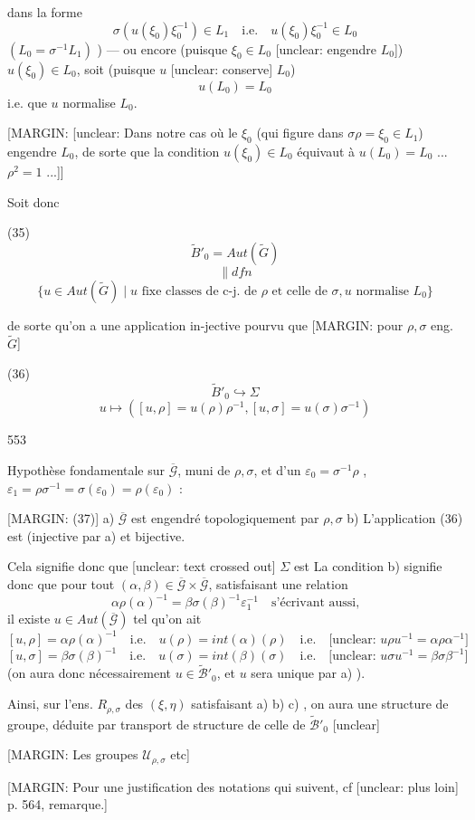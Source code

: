 dans la forme
$$ \sigma (u(\xi_0) \xi_0^{-1}) \in L_1 \quad \text{i.e.} \quad u(\xi_0) \xi_0^{-1} \in L_0 $$
$(L_0 = \sigma^{-1} L_1)$ ) — ou encore (puisque $\xi_0 \in L_0$ [unclear: engendre $L_0$])
$u(\xi_0) \in L_0$, soit (puisque $u$ [unclear: conserve] $L_0$)
$$ u(L_0) = L_0 $$
i.e. que $u$ normalise $L_0$.

[MARGIN: [unclear: Dans notre cas où le $\xi_0$ (qui figure dans $\sigma \rho = \xi_0 \in L_1$) engendre $L_0$, de sorte que la condition $u(\xi_0) \in L_0$ équivaut à $u(L_0) = L_0$ ... $\rho^2=1$ ...]]

Soit donc

(35)
$$ \tilde{B}'_0 = Aut(\tilde{G}) $$
$$ \| dfn $$
$$ \{u \in Aut(\tilde{G}) \mid u \text{ fixe classes de c-j. de } \rho \text{ et celle de } \sigma, u \text{ normalise } L_0 \} $$

de sorte qu'on a une application in-jective pourvu que
[MARGIN: pour $\rho,\sigma$ eng. $\tilde{G}$]

(36)
$$ \tilde{B}'_0 \hookrightarrow \Sigma $$
$$ u \longmapsto ([u,\rho] = u(\rho)\rho^{-1}, [u,\sigma] = u(\sigma)\sigma^{-1}) $$

\newpage


553

Hypothèse fondamentale sur $\overline{\mathcal{G}}$, muni de $\rho, \sigma$, et d'un $\varepsilon_0 = \sigma^{-1}\rho$ ,
$\varepsilon_1 = \rho \sigma^{-1} = \sigma(\varepsilon_0) = \rho(\varepsilon_0)$ :

[MARGIN: (37)]
a) $\overline{\mathcal{G}}$ est engendré topologiquement par $\rho, \sigma$
b) L'application (36) est (injective par a) et bijective.

Cela signifie donc que [unclear: text crossed out] $\Sigma$ est
La condition b) signifie donc que pour tout
$(\alpha, \beta) \in \overline{\mathcal{G}} \times \overline{\mathcal{G}}$, satisfaisant une relation
$$\alpha \rho(\alpha)^{-1} = \beta \sigma(\beta)^{-1} \varepsilon_1^{-1} \quad \text{s'écrivant aussi,}$$
il existe $u \in Aut(\overline{\mathcal{G}})$ tel qu'on ait
$$[u, \rho] = \alpha \rho(\alpha)^{-1} \quad \text{i.e.} \quad u(\rho) = int(\alpha)(\rho) \quad \text{i.e.} \quad \text{[unclear: } u \rho u^{-1} = \alpha \rho \alpha^{-1}]$$
$$[u, \sigma] = \beta \sigma(\beta)^{-1} \quad \text{i.e.} \quad u(\sigma) = int(\beta)(\sigma) \quad \text{i.e.} \quad \text{[unclear: } u \sigma u^{-1} = \beta \sigma \beta^{-1}]$$
(on aura donc nécessairement $u \in \widetilde{\mathcal{B}}'_0$, et
$u$ sera unique par a) ).

Ainsi, sur l'ens. $R_{\rho, \sigma}$ des $(\xi, \eta)$ satisfaisant
a) b) c) , on aura une structure de groupe,
déduite par transport de structure de celle de $\widetilde{\mathcal{B}}'_0$
[unclear]

\newpage


[MARGIN: Les groupes $\mathcal{U}_{\rho,\sigma}$ etc]

[MARGIN: Pour une justification des notations qui suivent, cf [unclear: plus loin] p. 564, remarque.]

